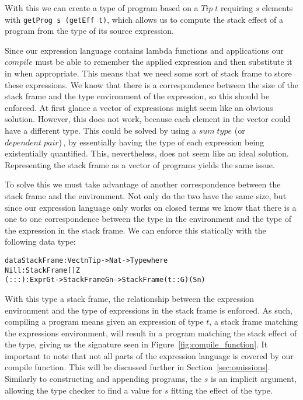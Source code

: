 With this we can create a type of program based on a $Tip\;t$ requiring $s$ elements with \texttt{getProg s (getEff t)}, which allows us to compute the stack effect of a program from the type of its source expression.

Since our expression language contains lambda functions and applications our $compile$ must be able to remember the applied expression and then substitute it in when appropriate. This means that we need some sort of stack frame to store these expressions. We know that there is a correspondence between the size of the stack frame and the type environment of the expression, so this should be enforced. At first glance a vector of expressions might seem like an obvious solution. However, this does not work, because each element in the vector could have a different type. This could be solved by using a $sum\;type$ (or $dependent\;pair$)\,\cite[p. 14]{Brady:IdrisTutorial}, by essentially having the type of each expression being existentially quantified. This, nevertheless, does not seem like an ideal solution. Representing the stack frame as a vector of programs yields the same issue.

To solve this we must take advantage of another correspondence between the stack frame and the environment. Not only do the two have the same size, but since our expression language only works on closed terms we know that there is a one to one correspondence between the type in the environment and the type of the expression in the stack frame. We can enforce this statically with the following data type:

\begin{alltt}
data StackFrame : Vect n Tip -> Nat -> Type where
	Nill : StackFrame [] Z
	(:::) : Expr G t -> StackFrame G n -> StackFrame (t :: G) (S n)
\end{alltt}

With this type a stack frame, the relationship between the expression environment and the type of expressions in the stack frame is enforced. As such, compiling a program means given an expression of type $t$, a stack frame matching the expressions environment, will result in a program matching the stack effect of the type, giving us the signature seen in Figure~\ref{fig:compile_function}. It important to note that not all parts of the expression language is covered by our compile function. This will be discussed further in Section~\ref{sec:omissions}. Similarly to constructing and appending programs, the $s$ is an implicit argument, allowing the type checker to find a value for $s$ fitting the effect of the type.

